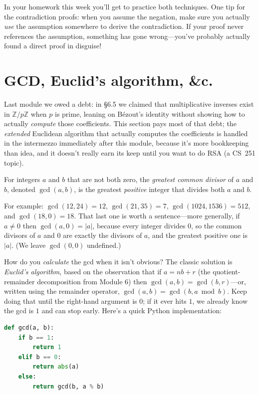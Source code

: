 \documentclass[11pt]{article}
\begin{document}
In your homework this week you'll get to practice both techniques. One tip for the contradiction proofs: when you assume the negation, make sure you actually \emph{use} the assumption somewhere to derive the contradiction. If your proof never references the assumption, something has gone wrong---you've probably actually found a direct proof in disguise!

\section{GCD, Euclid's algorithm, \&c.}
Last module we owed a debt: in §6.5 we claimed that multiplicative inverses exist in $\mathbb{Z}/p\mathbb{Z}$ when $p$ is prime, leaning on B\'ezout's identity without showing how to actually \emph{compute} those coefficients. This section pays most of that debt; the \emph{extended} Euclidean algorithm that actually computes the coefficients is handled in the intermezzo immediately after this module, because it's more bookkeeping than idea, and it doesn't really earn its keep until you want to do RSA (a CS~251 topic).

\begin{definition}
For integers $a$ and $b$ that are not both zero, the \emph{greatest common divisor} of $a$ and $b$, denoted $\gcd(a,b)$, is the greatest \emph{positive} integer that divides both $a$ and $b$.
\end{definition}

For example: $\gcd(12, 24) = 12$, $\gcd(21, 35) = 7$, $\gcd(1024, 1536) = 512$, and $\gcd(18, 0) = 18$. That last one is worth a sentence---more generally, if $a \neq 0$ then $\gcd(a, 0) = |a|$, because every integer divides $0$, so the common divisors of $a$ and $0$ are exactly the divisors of $a$, and the greatest positive one is $|a|$. (We leave $\gcd(0, 0)$ undefined.)

How do you \emph{calculate} the gcd when it isn't obvious? The classic solution is \emph{Euclid's algorithm}, based on the observation that if $a = nb + r$ (the quotient-remainder decomposition from Module 6) then $\gcd(a, b) = \gcd(b, r)$---or, written using the remainder operator, $\gcd(a, b) = \gcd(b, a \bmod b)$. Keep doing that until the right-hand argument is $0$; if it ever hits $1$, we already know the gcd is $1$ and can stop early. Here's a quick Python implementation:
\begin{lstlisting}[language=Python]
def gcd(a, b):
    if b == 1:
        return 1
    elif b == 0:
        return abs(a)
    else:
        return gcd(b, a % b)
\end{lstlisting}
\end{document}
